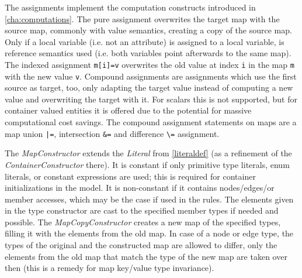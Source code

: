 The assignments implement the computation constructs introduced in \ref{cha:computations}.
The pure assignment overwrites the target map with the source map, commonly with value semantics, creating a copy of the source map. Only if a local variable (i.e. not an attribute) is assigned to a local variable, is reference semantics used  (i.e. both variables point afterwards to the same map).
The indexed assignment \texttt{m[i]=v} overwrites the old value at index \texttt{i} in the map \texttt{m} with the new value \texttt{v}.
Compound assignments are assignments which use the first source as target, too,
only adapting the target value instead of computing a new value and overwriting the target with it.
For scalars this is not supported, but for container valued entities it is offered due to the potential for massive computational cost savings.
The compound assignment statements on maps are a map union \verb#|=#, intersection \verb#&=# and difference \verb#\=# assignment.

The \emph{MapConstructor} extends the \emph{Literal} from \ref{literaldef} (as a refinement of the \emph{ContainerConstructor} there).
It is constant if only primitive type literals, enum literals, or constant expressions are used; this is required for container initializations in the model.
It is non-constant if it contains nodes/edges/or member accesses, which may be the case if used in the rules.
The elements given in the type constructor are cast to the specified member types if needed and possible.
The \emph{MapCopyConstructor} creates a new map of the specified types, filling it with the elements from the old map. 
In case of a node or edge type, the types of the original and the constructed map are allowed to differ, 
only the elements from the old map that match the type of the new map are taken over then (this is a remedy for map key/value type invariance).



